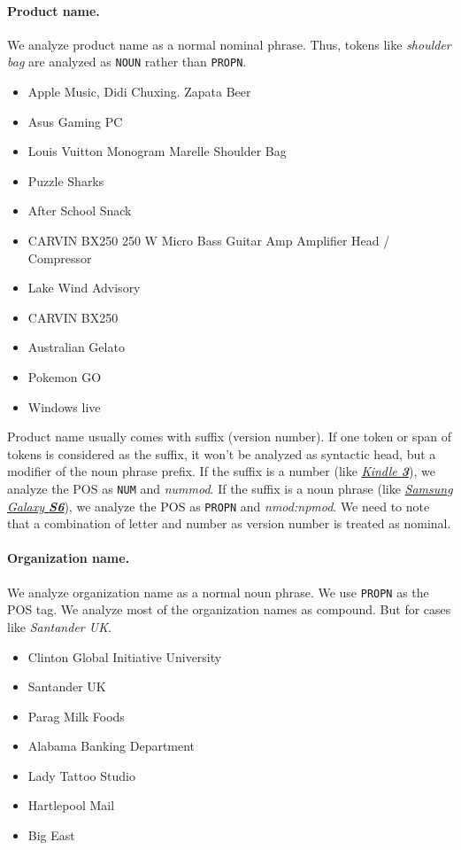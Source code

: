\documentclass[11pt,a4paper]{article}
\begin{document}
\paragraph{Product name.}
We analyze product name as a normal nominal phrase.
Thus, tokens like \textit{shoulder bag} are analyzed as \texttt{NOUN} rather than \texttt{PROPN}.
\begin{itemize}
	\item Apple Music, Didi Chuxing. Zapata Beer
	\item Asus Gaming PC
	\item Louis Vuitton Monogram Marelle Shoulder Bag
	\item Puzzle Sharks
	\item After School Snack
	\item CARVIN BX250 250 W Micro Bass Guitar Amp Amplifier Head / Compressor
	\item Lake Wind Advisory
	\item CARVIN BX250
	\item Australian Gelato
	\item Pokemon GO
	\item Windows live
\end{itemize}

Product name usually comes with suffix (version number).
If one token or span of tokens is considered as the suffix, 
it won't be analyzed as syntactic head, but a modifier of the noun phrase prefix.
If the suffix is a number (like \underline{\textit{Kindle \textbf{3}}}), we analyze the POS as \texttt{NUM} and \textit{nummod}.
If the suffix is a noun phrase (like \underline{\textit{Samsung Galaxy \textbf{S6}}}), we analyze the POS as \texttt{PROPN} and \textit{nmod:npmod}.
We need to note that a combination of letter and number as version number is treated as nominal.

\paragraph{Organization name.} 
We analyze organization name as a normal noun phrase.
We use \texttt{PROPN} as the POS tag.
We analyze most of the organization names as compound.
But for cases like \textit{Santander UK}.
\begin{itemize}
	\item Clinton Global Initiative University
	\item Santander UK
	\item Parag Milk Foods
	\item Alabama Banking Department
	\item Lady Tattoo Studio
	\item Hartlepool Mail
	\item Big East
\end{itemize}
\end{document}
